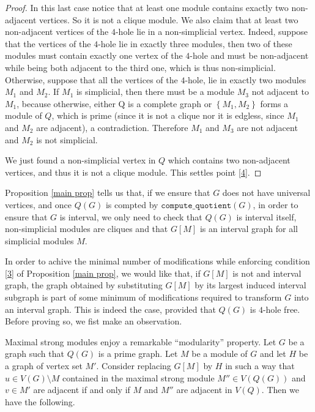 \documentclass{article}
\theoremstyle{definition}
\begin{document}
\begin{proof}
        In this last case notice that at least one module
        contains exactly two non-adjacent vertices.
        So it is not a clique module.
        We also claim that at least two non-adjacent
        vertices of the $4$-hole lie in a non-simplicial vertex.
        Indeed, suppose that the vertices of the $4$-hole
        lie in exactly three modules, then two of these
        modules must contain
        exactly one vertex of the $4$-hole
        and must be non-adjacent
        while being both adjacent to the
        third one, which is thus non-simplicial. 
        Otherwise, suppose that all the vertices of the $4$-hole, 
        lie in exactly two modules $M_1$ and $M_2$.
        If $M_1$ is simplicial, then there must be a module $M_3$
        not adjacent to $M_1$, because otherwise, either Q is a
        complete graph or $\left\{M_1, M_2\right\}$ forms a module
        of $Q$, which is prime (since it is not a clique
        nor it is edgless, since $M_1$ and $M_2$ are
        adjacent),
        a contradiction. 
        Therefore $M_1$ and $M_3$ are not adjacent and
        $M_2$ is not simplicial.
        
        We just found a non-simplicial vertex in $Q$
        which contains two non-adjacent vertices, and thus
        it is not a clique module. This settles point \ref{4}.
    \end{proof}
 
    Proposition \ref{main prop} tells us that,
    if we ensure that
    $G$ does not have universal
    vertices, and
    once $Q\left(G\right)$ is
    compted by $\texttt{compute\_quotient}\left(G\right)$,
    in order to ensure that
    $G$ is interval,
    we only need to check that 
    $Q\left(G\right)$ is interval
    itself,
    non-simplicial modules are cliques and
    that $G\left[M\right]$ is
    an interval graph for all simplicial
    modules $M$.

    In order to
    achive the minimal 
    number of modifications
    while enforcing
    condition \ref{3}
    of Proposition \ref{main prop},
    we would like that,
    if $G\left[M\right]$ is not
    and interval graph, the
    graph obtained by substituting
    $G\left[M\right]$ by its
    largest induced interval subgraph
    is part of some minimum
    of modifications required to
    transform $G$ into an
    interval graph.
    This is indeed the case,
    provided that $Q\left(G\right)$
    is $4$-hole free.
    Before proving so,
    we fist make an observation.

    Maximal strong modules
    enjoy a remarkable ``modularity''
    property.
    Let $G$ be a graph such
    that $Q\left(G\right)$ is
    a prime graph. Let $M$ be
    a module of $G$ and let
    $H$ be a graph of
    vertex set $M'$.
    Consider replacing $G\left[M\right]$ 
    by $H$ in such a way 
    that $u \in V \left(G\right) \setminus M$
    contained in the maximal
    strong module $M'' \in V\left(Q\left(G\right)\right)$
    and $v \in M'$ are
    adjacent if and only if
    $M$ and $M''$ are adjacent
    in $V\left(Q\right)$.
    Then we have the following.
    
\end{document}
